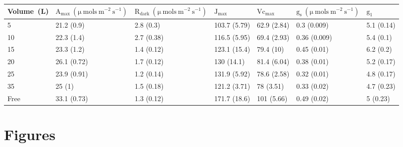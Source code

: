 \documentclass[a4paper]{article}\usepackage[]{graphicx}\usepackage[]{color}
\begin{document}
\begin{table}
\centering
\begin{tabular}{lllllll}
  \hline
	{Volume~(L)} & $\mathrm{A_{max}~(\mu~mols~m^{-2}~s^{-1})}$ & $\mathrm{R_{dark}~(\mu~mols~m^{-2}~s^{-1})}$ & $\mathrm{J_{max}}$ & $\mathrm{Vc_{max}}$ & $\mathrm{g_s~(\mu~mols~m^{-2}~s^{-1})}$ & $\mathrm{g_1}$ \\ 
  \hline
5 & 21.2 (0.9) & 2.8 (0.3) & 103.7 (5.79) & 62.9 (2.84) & 0.3 (0.009) & 5.1 (0.14) \\ 
  10 & 22.3 (1.4) & 2.7 (0.38) & 116.5 (5.95) & 69.4 (2.93) & 0.36 (0.009) & 5.4 (0.1) \\ 
  15 & 23.3 (1.2) & 1.4 (0.12) & 123.1 (15.4) & 79.4 (10) & 0.45 (0.01) & 6.2 (0.2) \\ 
  20 & 26.1 (0.72) & 1.7 (0.12) & 130 (14.1) & 81.4 (6.04) & 0.38 (0.01) & 5.2 (0.17) \\ 
  25 & 23.9 (0.91) & 1.2 (0.14) & 131.9 (5.92) & 78.6 (2.58) & 0.32 (0.01) & 4.8 (0.17) \\ 
  35 & 25 (1) & 1.5 (0.18) & 121.2 (3.71) & 78 (3.51) & 0.33 (0.02) & 4.7 (0.23) \\ 
  Free & 33.1 (0.73) & 1.3 (0.12) & 171.7 (18.6) & 101 (5.66) & 0.49 (0.02) & 5 (0.23) \\ 
   \hline
\end{tabular}
\label{table:Table2}
\end{table}





\clearpage
\section*{Figures}
\end{document}
